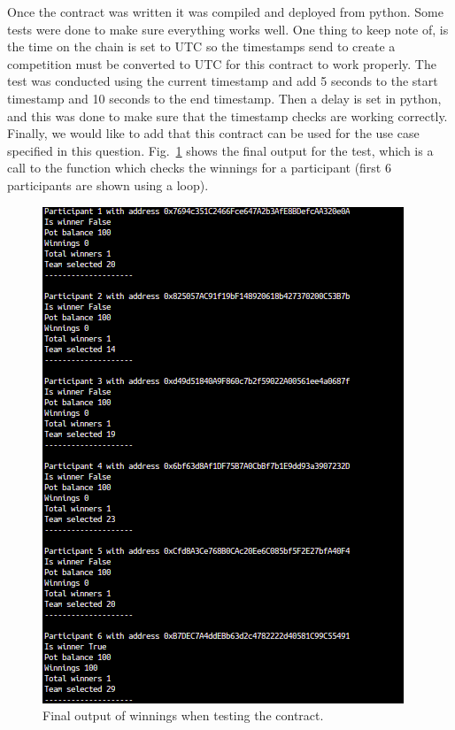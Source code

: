 \noindent
Once the contract was written it was compiled and deployed from python. Some tests were done to make sure everything works well. One thing to keep note of, is the time on the chain is set to UTC so the timestamps send to create a competition must be converted to UTC for this contract to work properly. The test was conducted using the current timestamp and add 5 seconds to the start timestamp and 10 seconds to the end timestamp. Then a delay is set in python, and this was done to make sure that the timestamp checks are working correctly. Finally, we would like to add that this contract can be used for the use case specified in this question. Fig.~\ref{fig:comp_sol_12} shows the final output for the test, which is a call to the function which checks the winnings for a participant (first 6 participants are shown using a loop). 

\begin{figure}[H]
\centering
  \includegraphics[scale = .65]{imgs/comp_sol_12.png}
  \caption{Final output of winnings when testing the contract.}
  \label{fig:comp_sol_12}
\end{figure}

